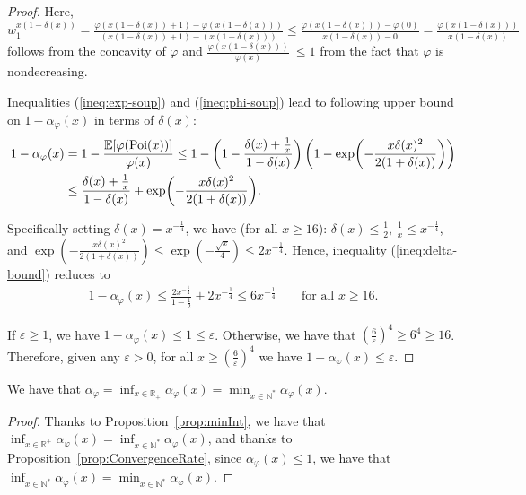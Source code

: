 \begin{proof}
Here, $w^{x(1-\delta(x))}_1 = \frac{\varphi(x(1-\delta(x))+1) - \varphi(x(1-\delta(x)))}{(x(1-\delta(x))+1)-(x(1-\delta(x)))} \leq \frac{\varphi(x(1-\delta(x)))-\varphi(0)}{x(1-\delta(x))-0}= \frac{\varphi(x(1-\delta(x)))}{x(1-\delta(x))}$ follows from the concavity of $\varphi$ and $\frac{\varphi(x(1-\delta(x)))}{\varphi(x)}\ \leq 1$ from the fact that $\varphi$ is nondecreasing. 

Inequalities (\ref{ineq:exp-soup}) and (\ref{ineq:phi-soup}) lead to following upper bound on $1 - \alpha_{\varphi}(x)$ in terms of $\delta(x)$: 
    \begin{align}
        1 - \alpha_{\varphi}(x) & = 1 - \frac{\mathbb{E}[\varphi(\operatorname{\text{Poi}}(x))]}{\varphi(x)} \leq 1 - \left(1-\frac{\delta(x) + \frac{1}{x}}{1-\delta(x)}\right)\left(1-\exp(-\frac{x\delta(x)^2}{2(1+\delta(x))})\right) \nonumber \\
         & \leq  \frac{\delta(x) + \frac{1}{x}}{1-\delta(x)} +  \exp(-\frac{x\delta(x)^2}{2(1+\delta(x))}). \label{ineq:delta-bound}
    \end{align}

   
Specifically setting $\delta(x)=x^{-\frac{1}{4}}$, we have (for all $x \geq 16$): $\delta(x) \leq \frac{1}{2}$, $\frac{1}{x} \leq x^{-\frac{1}{4}}$, and $\exp(-\frac{x\delta(x)^2}{2(1+\delta(x))}) \leq \exp(-\frac{\sqrt{x}}{4}) \leq 2x^{-\frac{1}{4}}$. Hence, inequality (\ref{ineq:delta-bound}) reduces to 
\begin{align*}
1 - \alpha_{\varphi}(x) \leq \frac{2x^{-\frac{1}{4}}}{1-\frac{1}{2}} + 2x^{-\frac{1}{4}} \leq 6x^{-\frac{1}{4}} \qquad \text{for all $x \geq 16$.}
\end{align*}

If $\varepsilon \geq 1$, we have $1 - \alpha_{\varphi}(x) \leq 1 \leq \varepsilon$. Otherwise, we have that $\left(\frac{6}{\varepsilon}\right)^4 \geq 6^4 \geq 16$. Therefore, given any $\varepsilon >0$, for all $x \geq \left(\frac{6}{\varepsilon}\right)^4$ we have $1 - \alpha_{\varphi}(x) \leq \varepsilon$.
\end{proof}

\begin{proposition}
    We have that $\alpha_{\varphi} = \inf_{x \in \mathbb{R}_+} \alpha_{\varphi}(x) = \min_{x \in \mathbb{N}^*} \alpha_{\varphi}(x)$.
  \label{prop:minNotInf}
\end{proposition}

\begin{proof}
  Thanks to Proposition~\ref{prop:minInt}, we have that $\inf_{x \in \mathbb{R}^+} \alpha_{\varphi}(x) = \inf_{x \in \mathbb{N}^*} \alpha_{\varphi}(x)$, and thanks to Proposition~\ref{prop:ConvergenceRate}, since $\alpha_{\varphi}(x) \leq 1$, we have that $\inf_{x \in \mathbb{N}^*} \alpha_{\varphi}(x) = \min_{x \in \mathbb{N}^*} \alpha_{\varphi}(x)$.
\end{proof}



